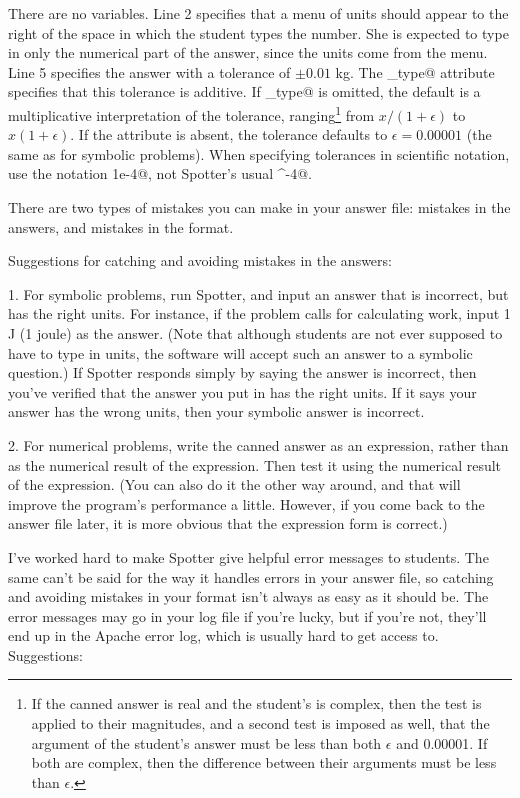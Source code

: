 \documentclass{doc}
\begin{document}
There are no variables. Line 2 specifies that a menu of units should
appear to the right of the space in which the student types the number.
She is expected to type in only the numerical part of the answer, since
the units come from the menu. Line 5 specifies the answer with
a tolerance of $\pm0.01$ kg. The \verb@tol_type@ attribute specifies
that this tolerance is additive. If \verb@tol_type@ is omitted,
the default is a multiplicative interpretation of the tolerance,
ranging\footnote{If the canned answer is real and the student's
is complex, then the test is applied to their magnitudes, and
a second test is imposed as well, that the argument of the student's answer must be
less than both $\epsilon$ and 0.00001. If both are complex, then the
difference between their
arguments must be less than $\epsilon$.}
 from $x/(1+\epsilon)$ to $x(1+\epsilon)$.
 If the \verb@tol@ attribute is
absent, the tolerance defaults to $\epsilon=0.00001$ (the same as for symbolic problems).
When specifying tolerances in scientific notation, use the notation
\verb@1e-4@, not Spotter's usual ^-4@.

\label{debugginganswerfile}
There are two types of mistakes you can make in your answer file: mistakes in the
answers, and mistakes in the format. 

Suggestions for catching and avoiding
mistakes in the answers:

1. For symbolic problems, run Spotter, and input an answer that is incorrect, but has the right units.
For instance, if the problem calls for calculating work, input 1 J (1 joule) as
the answer. (Note that although students are not ever supposed to have to type in
units, the software will accept such an answer to a symbolic question.) If Spotter
responds simply by saying the answer is incorrect, then you've verified that the
answer you put in has the right units. If it says your answer has the wrong units,
then your symbolic answer is incorrect.

2. For numerical problems, write the canned answer as an expression, rather than
as the numerical result of the expression. Then test it using the numerical
result of the expression. (You can also do it the other way around, and that will
improve the program's performance a little. However, if you come back to the answer
file later, it is more obvious that the expression form is correct.)


I've worked hard to make Spotter give helpful error messages to students. The same
can't be said for the way it handles errors in your answer file, so 
catching and avoiding mistakes in your format isn't always as easy as it should be.
The error messages
may go in your log file if you're lucky, but if you're not, they'll end up in the
Apache error log, which is usually hard to get access to. Suggestions:
\end{document}

